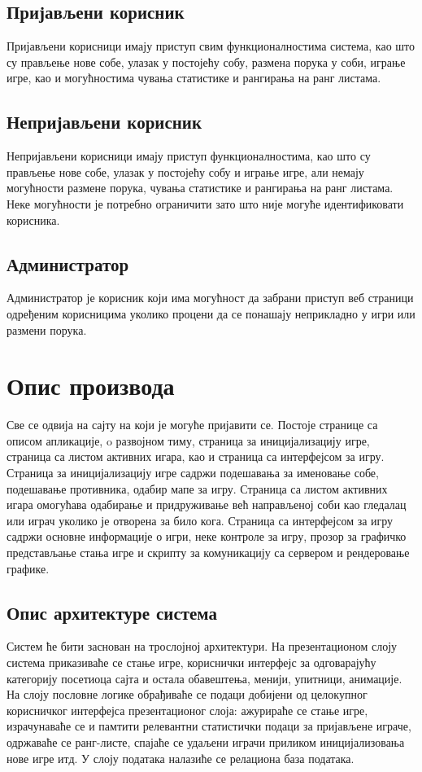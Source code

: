 \subsection{Пријављени корисник}
Пријављени корисници имају приступ свим функционалностима система, као што су прављење нове собе, улазак у
постојећу собу, размена порука у соби, играње игре, као и могућностима чувања статистике и рангирања на ранг
листама.

\subsection{Непријављени корисник}
Непријављени корисници имају приступ функционалностима, као што су прављење нове собе, улазак у постојећу собу и
играње игре, али немају могућности размене порука, чувања статистике и рангирања на ранг листама. 
Неке могућности је потребно ограничити зато што није могуће идентификовати корисника.

\subsection{Администратор}
Администратор је корисник који има могућност да забрани приступ  веб страници одређеним корисницима 
уколико процени да се понашају неприкладно у игри или размени порука.



\section{Опис производа}
Све се одвија на сајту на који је могуће пријавити се. Постоје странице са описом апликације, o развојном тиму,
страница за иницијализацију игре, страница са листом активних игара, као и страница са интерфејсом за игру.
Страница за иницијализацију игре садржи подешавања за именовање собе, подешавање противника, одабир мапе за игру.
Страница са листом активних игара омогућава одабирање и придруживање већ направљеној соби као гледалац или играч
уколико је отворена за било кога. Страница са интерфејсом за игру садржи основне информације о игри, неке контроле
за игру, прозор за графичко представљање стања игре и скрипту за комуникацију са сервером и рендеровање графике.

\subsection{Опис архитектуре система}
Систем ће бити заснован на трослојној архитектури. На презентационом слоју система приказиваће се стање игре,
кориснички интерфејс за одговарајућу категорију посетиоца сајта и остала обавештења, менији, упитници, анимације.
На слоју пословне логике обрађиваће се подаци добијени од целокупног корисничког интерфејса презентационог слоја:
ажурираће се стање игре, израчунаваће се и памтити релевантни статистички подаци за пријављене играче, одржаваће
се ранг-листе, спајаће се удаљени играчи приликом иницијализовања нове игре итд. У слоју података налазиће се
релациона база података.

